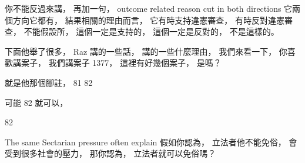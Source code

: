 \hypertarget{w06:cue:2342}{}你不能反過來講，
\hypertarget{w06:cue:2343}{}再加一句，
\hypertarget{w06:cue:2344}{}outcome related reason cut in both directions
\hypertarget{w06:cue:2345}{}它兩個方向它都有，
\hypertarget{w06:cue:2346}{}結果相關的理由而言，
\hypertarget{w06:cue:2347}{}它有時支持違憲審查，
\hypertarget{w06:cue:2348}{}有時反對違憲審查，
\hypertarget{w06:cue:2349}{}不能假設所，
\hypertarget{w06:cue:2350}{}這個一定是支持的，
\hypertarget{w06:cue:2351}{}這個一定是反對的，
\hypertarget{w06:cue:2352}{}不是這樣的。

\hypertarget{w06:cue:2353}{}下面他舉了很多，
\hypertarget{w06:cue:2354}{}Raz 講的一些話，
\hypertarget{w06:cue:2355}{}講的一些什麼理由，
\hypertarget{w06:cue:2356}{}我們來看一下，
\hypertarget{w06:cue:2357}{}你喜歡講案子，
\hypertarget{w06:cue:2358}{}我們講案子 1377，
\hypertarget{w06:cue:2359}{}這裡有好幾個案子，
\hypertarget{w06:cue:2360}{}是嗎？

\hypertarget{w06:cue:2361}{}就是他那個腳註，
\hypertarget{w06:cue:2362}{}81 82

\hypertarget{w06:cue:2363}{}可能 82 就可以，

\hypertarget{w06:cue:2364}{}82

\hypertarget{w06:cue:2365}{}The same
\hypertarget{w06:cue:2366}{}Sectarian pressure
\hypertarget{w06:cue:2367}{}often explain
\hypertarget{w06:cue:2368}{}假如你認為，
\hypertarget{w06:cue:2369}{}立法者他不能免俗，
\hypertarget{w06:cue:2370}{}會受到很多社會的壓力，
\hypertarget{w06:cue:2371}{}那你認為，
\hypertarget{w06:cue:2372}{}立法者就可以免俗嗎？

